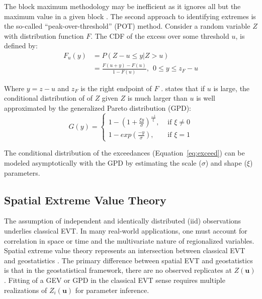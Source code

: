 The block maximum methodology may be inefficient as it ignores all but the maximum value in a given block \citep{davison2015statistics}. The second approach to identifying extremes is the so-called ``peak-over-threshold'' (POT) method. Consider a random variable $Z$ with distribution function $F$. The CDF of the excess over some threshold $u$, is defined by:
\begin{equation}
    \begin{aligned}
        F_u(y) & = P(Z - u \leq y | Z > u)                               \\
               & = \frac{F(u+y) - F(u)}{1-F(u)}, \ \ 0 \leq y \leq z_F-u
    \end{aligned}
    \label{eq:exceed}
\end{equation}

Where $y = z - u$ and $z_F$ is the right endpoint of $F$ \citep{gilli2006application}. \cite{pickands1975statistical} states that if $u$ is large, the conditional distribution of of $Z$ given $Z$ is much larger than $u$ is well approximated by the generalized Pareto distribution (GPD):
\begin{equation}
    G(y) =
    \begin{cases}
        1 - \left(1 + \frac{\xi y}{\sigma}\right)^{\frac{-1}{\xi }}, & \text{ if } \xi  \neq 0 \\
        1-exp\left(\frac{-y}{\sigma} \right),                        & \text{ if } \xi  = 1
    \end{cases}
    \label{eq:GPD}
\end{equation}

The conditional distribution of the exceedances (Equation~\ref{eq:exceed}) can be modeled asymptotically with the GPD by estimating the scale ($\sigma$) and shape ($\xi$) parameters.

\FloatBarrier
\subsection{Spatial Extreme Value Theory}
\label{subsec:01spevt}

The assumption of independent and identically distributed (iid) observations underlies classical EVT. In many real-world applications, one must account for correlation in space or time and the multivariate nature of regionalized variables. Spatial extreme value theory represents an intersection between classical EVT and geostatistics \citep{neves2015geostatistical}. The primary difference between spatial EVT and geostatistics is that in the geostatistical framework, there are no observed replicates at $Z(\mathbf{u})$. Fitting of a GEV or GPD in the classical EVT sense requires multiple realizations of $Z_i(\mathbf{u})$ for parameter inference.

